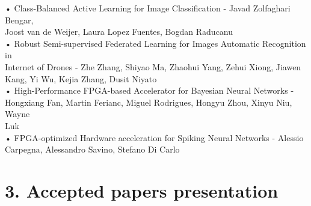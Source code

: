 \documentclass[11pt, a4paper, oneside, pdftex]{research_paper}
\begin{document}
\null \hspace{10mm} • \quad	Class-Balanced Active Learning for Image Classification - Javad Zolfaghari Bengar, \\ \null \hspace{17mm} Joost van de Weijer, Laura Lopez Fuentes, Bogdan Raducanu \\
\null \hspace{10mm} • \quad	Robust Semi-supervised Federated Learning for Images Automatic Recognition in \\ \null \hspace{17mm} Internet of Drones - Zhe Zhang, Shiyao Ma, Zhaohui Yang, Zehui Xiong, Jiawen \\ \null \hspace{17mm} Kang, Yi Wu, Kejia Zhang, Dusit Niyato \\
\null \hspace{10mm} • \quad High-Performance FPGA-based Accelerator for Bayesian Neural Networks - \\ \null \hspace{17mm} Hongxiang Fan, Martin Ferianc, Miguel Rodrigues, Hongyu Zhou, Xinyu Niu, Wayne \\ \null \hspace{17mm} Luk \\
\null \hspace{10mm} • \quad FPGA-optimized Hardware acceleration for Spiking Neural Networks - Alessio \\ \null \hspace{17mm} Carpegna, Alessandro Savino, Stefano Di Carlo


\section*{3. Accepted papers presentation}
\end{document}
